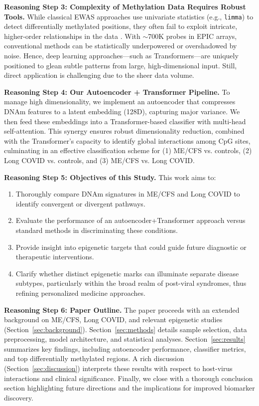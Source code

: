 \documentclass[journal]{IEEEtran}
\newcommand{\secref}[1]{Section~\ref{#1}}
\begin{document}
\vspace{0.5em}
\noindent\textbf{Reasoning Step 3: Complexity of Methylation Data Requires Robust Tools.} 
While classical EWAS approaches use univariate statistics (e.g., \texttt{limma}) to detect differentially methylated positions, they often fail to exploit intricate, higher-order relationships in the data \cite{Raushert2020machine}. With $\sim$700K probes in EPIC arrays, conventional methods can be statistically underpowered or overshadowed by noise. Hence, deep learning approaches—such as Transformers—are uniquely positioned to glean subtle patterns from large, high-dimensional input. Still, direct application is challenging due to the sheer data volume.

\vspace{0.5em}
\noindent\textbf{Reasoning Step 4: Our Autoencoder + Transformer Pipeline.} 
To manage high dimensionality, we implement an autoencoder that compresses DNAm features to a latent embedding (128D), capturing major variance. We then feed these embeddings into a Transformer-based classifier with multi-head self-attention. This synergy ensures robust dimensionality reduction, combined with the Transformer's capacity to identify global interactions among CpG sites, culminating in an effective classification scheme for (1) ME/CFS vs. controls, (2) Long COVID vs. controls, and (3) ME/CFS vs. Long COVID.

\vspace{0.5em}
\noindent\textbf{Reasoning Step 5: Objectives of this Study.} 
This work aims to:
\begin{enumerate}
\item Thoroughly compare DNAm signatures in ME/CFS and Long COVID to identify convergent or divergent pathways.
\item Evaluate the performance of an autoencoder+Transformer approach versus standard methods in discriminating these conditions.
\item Provide insight into epigenetic targets that could guide future diagnostic or therapeutic interventions.

\vspace{0.5em}
\item Clarify whether distinct epigenetic marks can illuminate separate disease subtypes, particularly within the broad realm of post-viral syndromes, thus refining personalized medicine approaches.
\end{enumerate}

\vspace{0.5em}
\noindent\textbf{Reasoning Step 6: Paper Outline.} 
The paper proceeds with an extended background on ME/CFS, Long COVID, and relevant epigenetic studies (\secref{sec:background}). \secref{sec:methods} details sample selection, data preprocessing, model architecture, and statistical analyses. \secref{sec:results} summarizes key findings, including autoencoder performance, classifier metrics, and top differentially methylated regions. A rich discussion (\secref{sec:discussion}) interprets these results with respect to host-virus interactions and clinical significance. Finally, we close with a thorough conclusion section highlighting future directions and the implications for improved biomarker discovery.
\end{document}
